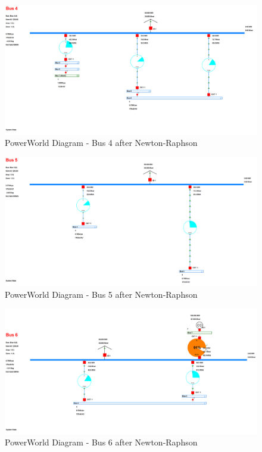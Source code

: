 \documentclass[12pt]{article}
\begin{document}
        \begin{figure}[H]
            \centerline{\includegraphics[scale=0.25]{images/PowerWorldBus4}}
            \caption{PowerWorld Diagram - Bus 4 after Newton-Raphson}
        \end{figure}

        \begin{figure}[H]
            \centerline{\includegraphics[scale=0.25]{images/PowerWorldBus5}}
            \caption{PowerWorld Diagram - Bus 5 after Newton-Raphson}
        \end{figure}

        \begin{figure}[H]
            \centerline{\includegraphics[scale=0.25]{images/PowerWorldBus6}}
            \caption{PowerWorld Diagram - Bus 6 after Newton-Raphson}
        \end{figure}
\end{document}
